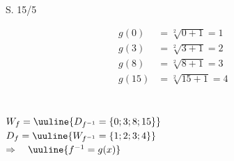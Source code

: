\begin{Exercise}{S. 15/5}{}
\begin{enumerate}
\begin{enumerate}[label=\alph*)]
{\begin{itemize}[leftmargin=*]
{\begin{minipage}[t]{0.45\linewidth}
                            \begin{align*}
                                g(0) &= \sqrt[2]{0 + 1} = 1 &&\\[1.5ex]
                                g(3) &= \sqrt[2]{3 + 1} = 2 &&\\[1.5ex]
                                g(8) &= \sqrt[2]{8 + 1} = 3 &&\\[1.5ex]
                                g(15) &= \sqrt[2]{15 + 1} = 4 &&\\[3.0ex]
                            \end{align*}
                        \end{minipage}\\
                        $W_{f} = \uuline{D_{f^{-1}} = \left\{0; 3; 8; 15 \right\}}$\\[1.0ex]
                        $D_{f} = \uuline{W_{f^{-1}} = \left\{1; 2; 3; 4 \right\}}$\\[1.0ex]
                        $\Rightarrow \quad \uuline{f^{-1} = g(x)}$\\
                        }                    
                \end{itemize}
            }
        \end{enumerate}
    \end{enumerate}
\end{Exercise}